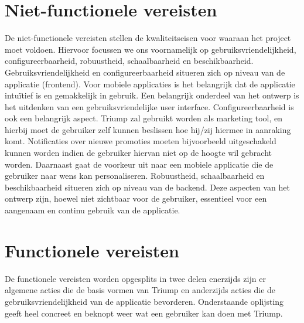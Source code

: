 \section{Niet-functionele vereisten}
De niet-functionele vereisten stellen de kwaliteitseisen voor waaraan het project moet voldoen. Hiervoor focussen we ons voornamelijk op gebruiksvriendelijkheid, configureerbaarheid, robuustheid, schaalbaarheid en beschikbaarheid.
Gebruiksvriendelijkheid en configureerbaarheid situeren zich op niveau van de applicatie (frontend). Voor mobiele applicaties is het belangrijk dat de applicatie intuïtief is en gemakkelijk in gebruik. Een belangrijk onderdeel van het ontwerp is het uitdenken van een gebruiksvriendelijke user interface. Configureerbaarheid is ook een belangrijk aspect. Triump zal gebruikt worden als marketing tool, en hierbij moet de gebruiker zelf kunnen beslissen hoe hij/zij hiermee in aanraking komt. Notificaties over nieuwe promoties moeten bijvoorbeeld uitgeschakeld kunnen worden indien de gebruiker hiervan niet op de hoogte wil gebracht worden. Daarnaast gaat de voorkeur uit naar een mobiele applicatie die de gebruiker naar wens kan personaliseren.
Robuustheid, schaalbaarheid en beschikbaarheid situeren zich op niveau van de backend. Deze aspecten van het ontwerp zijn, hoewel niet zichtbaar voor de gebruiker, essentieel voor een aangenaam en continu gebruik van de applicatie.
\section{Functionele vereisten}
De functionele vereisten worden opgesplits in twee delen enerzijds zijn er algemene acties die de basis vormen van Triump en anderzijds acties die de gebruiksvriendelijkheid van de applicatie bevorderen. Onderstaande oplijsting geeft heel concreet en beknopt weer wat een gebruiker kan doen met Triump.

